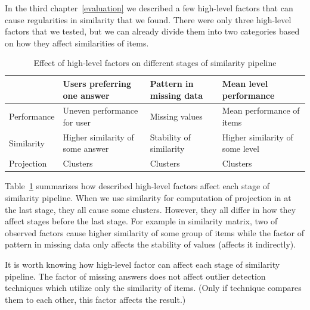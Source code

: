 \documentclass[
  printed, %
  table,   %
  nolof,     %
  nolot,     %
  color,
  final,
  nocover
]{fithesis3}
\begin{document}

In the third chapter~\ref{evaluation} we described a few high-level factors that can cause regularities in similarity that we found. There were only three high-level factors that we tested, but we can already divide them into two categories based on how they affect similarities of items.

\begin{table}
  \setlength{\tabcolsep}{0.12em} %
  {\scriptsize\renewcommand{\arraystretch}{1.0}%
    \begin{tabular}{ | l | l l l | }
      \hline
      \cellcolor[gray]{1.0} & Users preferring one answer      & Pattern in missing data & Mean level performance            \\
      \hline
      Performance           & Uneven performance for user      & Missing values          & Mean performance of items         \\
      Similarity            & Higher similarity of some answer & Stability of similarity & Higher similarity of some level   \\
      Projection            & Clusters                         & Clusters                & Clusters                          \\
      \hline
    \end{tabular}
  }
  \caption{Effect of high-level factors on different stages of similarity pipeline}
  \label{tab:effect-of-factors-on-stages}
\end{table}

Table~\ref{tab:effect-of-factors-on-stages} summarizes how described high-level factors affect each stage of similarity pipeline. When we use similarity for computation of projection in at the last stage, they all cause some clusters. However, they all differ in how they affect stages before the last stage. For example in similarity matrix, two of observed factors cause higher similarity of some group of items while the factor of pattern in missing data only affects the stability of values (affects it indirectly).

It is worth knowing how high-level factor can affect each stage of similarity pipeline. The factor of missing answers does not affect outlier detection techniques which utilize only the similarity of items. (Only if technique compares them to each other, this factor affects the result.)

\end{document}
